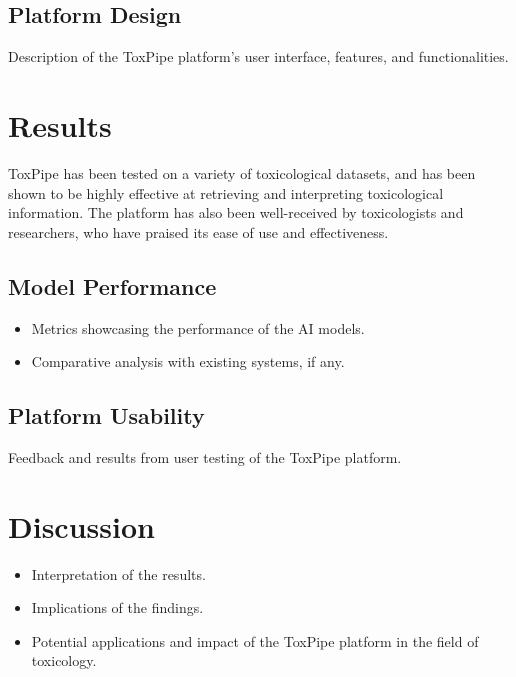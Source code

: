\documentclass[
  super,
  preprint,
  5p,
  twocolumn]{elsarticle}
\providecommand{\tightlist}{%
  \setlength{\itemsep}{0pt}\setlength{\parskip}{0pt}}\usepackage{longtable,booktabs,array}
\begin{document}
\hypertarget{platform-design}{%
\subsection{Platform Design}\label{platform-design}}

Description of the ToxPipe platform's user interface, features, and
functionalities.

\hypertarget{results}{%
\section{\texorpdfstring{Results }{Results }}\label{results}}

ToxPipe has been tested on a variety of toxicological datasets, and has
been shown to be highly effective at retrieving and interpreting
toxicological information. The platform has also been well-received by
toxicologists and researchers, who have praised its ease of use and
effectiveness.

\hypertarget{model-performance}{%
\subsection{Model Performance}\label{model-performance}}

\begin{itemize}
\tightlist
\item
  Metrics showcasing the performance of the AI models.
\item
  Comparative analysis with existing systems, if any.
\end{itemize}

\hypertarget{platform-usability}{%
\subsection{Platform Usability}\label{platform-usability}}

Feedback and results from user testing of the ToxPipe platform.

\hypertarget{discussion}{%
\section{Discussion}\label{discussion}}

\begin{itemize}
\tightlist
\item
  Interpretation of the results.
\item
  Implications of the findings.
\item
  Potential applications and impact of the ToxPipe platform in the field
  of toxicology.
\end{itemize}
\end{document}
